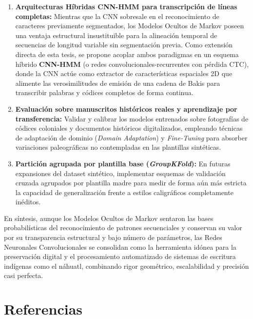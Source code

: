 \documentclass[
  spanish,
  us-letterpaper,
]{scrreprt}
\providecommand{\tightlist}{%
  \setlength{\itemsep}{0pt}\setlength{\parskip}{0pt}}
\theoremstyle{definition}
\theoremstyle{remark}
\begin{document}
\begin{enumerate}
\def\labelenumi{\arabic{enumi}.}
\tightlist
\item
  \textbf{Arquitecturas Híbridas CNN-HMM para transcripción de líneas
  completas:} Mientras que la CNN sobresale en el reconocimiento de
  caracteres previamente segmentados, los Modelos Ocultos de Markov
  poseen una ventaja estructural insustituible para la alineación
  temporal de secuencias de longitud variable sin segmentación previa.
  Como extensión directa de esta tesis, se propone acoplar ambos
  paradigmas en un esquema híbrido \textbf{CNN-HMM} (o redes
  convolucionales-recurrentes con pérdida CTC), donde la CNN actúe como
  extractor de características espaciales 2D que alimente las
  verosimilitudes de emisión de una cadena de Bakis para transcribir
  palabras y códices completos de forma continua.
\item
  \textbf{Evaluación sobre manuscritos históricos reales y aprendizaje
  por transferencia:} Validar y calibrar los modelos entrenados sobre
  fotografías de códices coloniales y documentos históricos
  digitalizados, empleando técnicas de adaptación de dominio
  (\emph{Domain Adaptation}) y \emph{Fine-Tuning} para absorber
  variaciones paleográficas no contempladas en las plantillas
  sintéticas.
\item
  \textbf{Partición agrupada por plantilla base (\emph{GroupKFold}):} En
  futuras expansiones del dataset sintético, implementar esquemas de
  validación cruzada agrupados por plantilla madre para medir de forma
  aún más estricta la capacidad de generalización frente a estilos
  caligráficos completamente inéditos.
\end{enumerate}

En síntesis, aunque los Modelos Ocultos de Markov sentaron las bases
probabilísticas del reconocimiento de patrones secuenciales y conservan
su valor por su transparencia estructural y bajo número de parámetros,
las Redes Neuronales Convolucionales se consolidan como la herramienta
idónea para la preservación digital y el procesamiento automatizado de
sistemas de escritura indígenas como el náhuatl, combinando rigor
geométrico, escalabilidad y precisión casi perfecta.


\chapter{Referencias}\label{referencias}
\end{document}
